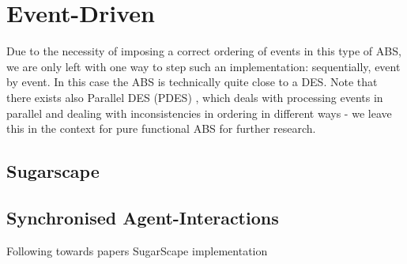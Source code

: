 \section{Event-Driven}
Due to the necessity of imposing a correct ordering of events in this type of ABS, we are only left with one way to step such an implementation: sequentially, event by event. In this case the ABS is technically quite close to a DES. Note that there exists also Parallel DES (PDES) \cite{fujimoto_parallel_1990}, which deals with processing events in parallel and dealing with inconsistencies in ordering in different ways - we leave this in the context for pure functional ABS for further research.

\subsection{Sugarscape}

\subsection{Synchronised Agent-Interactions}
Following towards papers SugarScape implementation


